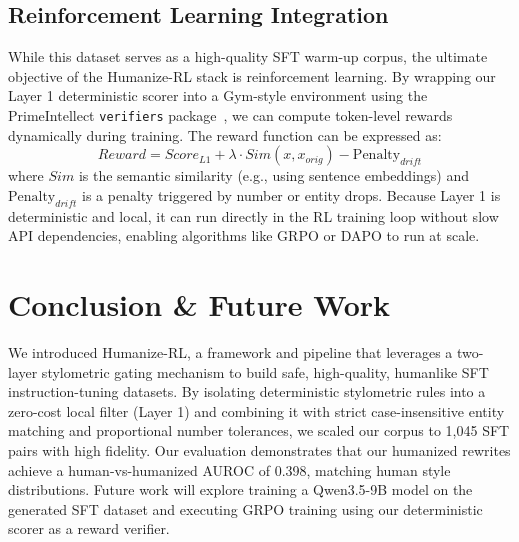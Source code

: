 \documentclass{article}
\begin{document}
\subsection{Reinforcement Learning Integration}
While this dataset serves as a high-quality SFT warm-up corpus, the ultimate objective of the Humanize-RL stack is reinforcement learning. By wrapping our Layer 1 deterministic scorer into a Gym-style environment using the PrimeIntellect \texttt{verifiers} package~\citep{verifiers}, we can compute token-level rewards dynamically during training. The reward function can be expressed as:
\begin{equation}
    Reward = Score_{L1} + \lambda \cdot Sim(x, x_{orig}) - \text{Penalty}_{drift}
\end{equation}
where $Sim$ is the semantic similarity (e.g., using sentence embeddings) and $\text{Penalty}_{drift}$ is a penalty triggered by number or entity drops. Because Layer 1 is deterministic and local, it can run directly in the RL training loop without slow API dependencies, enabling algorithms like GRPO or DAPO to run at scale.

\section{Conclusion \& Future Work}
We introduced Humanize-RL, a framework and pipeline that leverages a two-layer stylometric gating mechanism to build safe, high-quality, humanlike SFT instruction-tuning datasets. By isolating deterministic stylometric rules into a zero-cost local filter (Layer 1) and combining it with strict case-insensitive entity matching and proportional number tolerances, we scaled our corpus to 1,045 SFT pairs with high fidelity. Our evaluation demonstrates that our humanized rewrites achieve a human-vs-humanized AUROC of 0.398, matching human style distributions. Future work will explore training a Qwen3.5-9B model on the generated SFT dataset and executing GRPO training using our deterministic scorer as a reward verifier.



\end{document}
